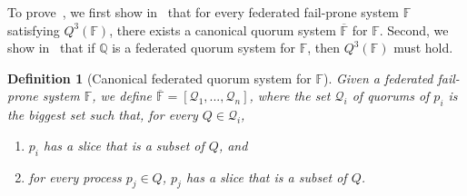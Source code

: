 \documentclass[11pt]{article}
\newtheorem{definition}{Definition}
\begin{document}
To prove~, we first show in~ that for every federated fail-prone system $\mathbb{F}$ satisfying $Q^3(\mathbb{F})$, there exists a canonical quorum system $\overline{\mathbb{F}}$ for $\mathbb{F}$. Second, we show in~ that if $\mathbb{Q}$ is a federated quorum system for $\mathbb{F}$, then $Q^3(\mathbb{F})$ must hold.

\begin{definition}[Canonical federated quorum system for $\mathbb{F}$]
  \label{def:canonical}
  Given a federated fail-prone system $\mathbb{F}$, we define $\overline{\mathbb{F}}=\left[\mathcal{Q}_1,...,\mathcal{Q}_n\right]$, where the set $\mathcal{Q}_i$ of quorums of $p_i$ is the biggest set such that, for every $Q\in\mathcal{Q}_i$,
  \begin{enumerate}
    \item $p_i$ has a slice that is a subset of $Q$, and
    \item for every process $p_j\in Q$, $p_j$ has a slice that is a subset of $Q$.
  \end{enumerate}
\end{definition}


\end{document}
